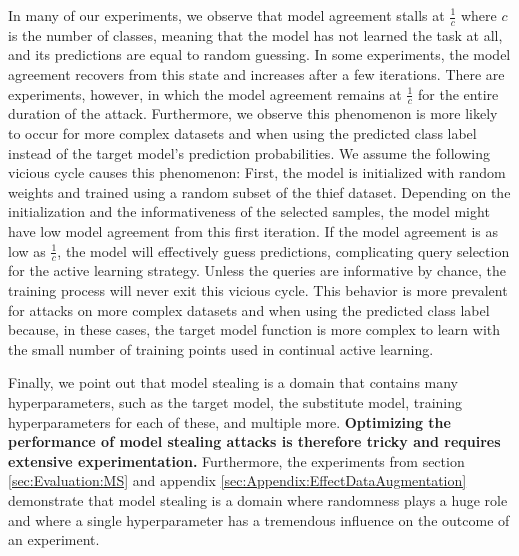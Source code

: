 In many of our experiments, we observe that model agreement stalls at $\frac{1}{c}$ where $c$ is the number of classes, meaning that the model has not learned the task at all, and its
predictions are equal to random guessing. In some experiments, the model agreement recovers from this state and increases after a few iterations. There are experiments,
however, in which the model agreement remains at $\frac{1}{c}$ for the entire duration of the attack. Furthermore, we observe this phenomenon is more likely to occur
for more complex datasets and when using the predicted class label instead of the target model's prediction probabilities. We assume the
following vicious cycle causes this phenomenon: First, the model is initialized with random weights and trained using a random subset of the thief dataset. Depending on the initialization and 
the informativeness of the selected samples, the model might have low model agreement from this first iteration. If the model agreement is as low as $\frac{1}{c}$, the
model will effectively guess predictions, complicating query selection for the active learning strategy. Unless the queries are informative by chance, the training process
will never exit this vicious cycle. This behavior is more prevalent for attacks on more complex datasets and when using the predicted class label because, in these cases,
the target model function is more complex to learn with the small number of training points used in continual active learning. \par
Finally, we point out that model stealing is a domain that contains many hyperparameters, such as the target model, the substitute model, training hyperparameters
for each of these, and multiple more. \textbf{Optimizing the performance of model stealing attacks is therefore tricky and requires extensive experimentation.}
Furthermore, the experiments from section
\ref{sec:Evaluation:MS} and appendix \ref{sec:Appendix:EffectDataAugmentation} demonstrate that model stealing is a domain where randomness plays a huge role and where
a single hyperparameter has a tremendous influence on the outcome of an experiment. 